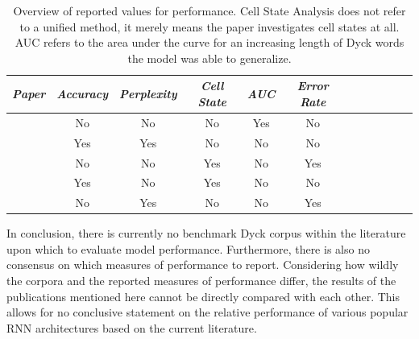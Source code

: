 \begin{table}
	\begin{tabularx}{\textwidth}{@{}l*{10}{C}c@{}}
	\toprule 
	\textit{Paper} & \textit{Accuracy} & \textit{Perplexity} & \textit{Cell State} & \textit{AUC} & \textit{Error Rate} \\
	\toprule
	\cite{Deleu2016} & No & No & No & Yes & No \\
	\cite{Skachkova2018} & Yes & Yes & No & No & No \\
	\cite{Sennhauser2018} & No & No & Yes & No & Yes \\
	\cite{Suzgun2019} & Yes & No & Yes & No & No\\
	\cite{Yu2019} & No & Yes & No & No & Yes \\ 
	\bottomrule
	\end{tabularx} 
	\caption[Reported values for performance in previous works]{Overview of reported values for performance. Cell State Analysis does not refer to a unified method, it merely means the paper investigates cell states at all. AUC refers to the area under the curve for an increasing length of Dyck words the model was able to generalize.}
	\label{tab:LiteratureReportedMeasures}
\end{table} 

In conclusion, there is currently no benchmark Dyck corpus within the literature upon which to evaluate model performance. Furthermore, there is also no consensus on which measures of performance to report. Considering how wildly the corpora and the reported measures of performance differ, the results of the publications mentioned here cannot be directly compared with each other. This allows for no conclusive statement on the relative performance of various popular RNN architectures based on the current literature.